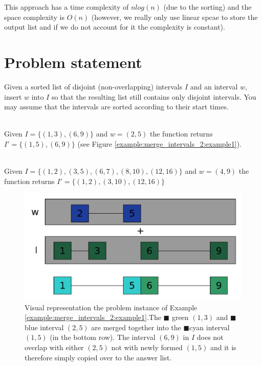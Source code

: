 This approach has a time complexity of $nlog(n)$ (due to the sorting) 
and the space complexity is $O(n)$ (however, we really only use linear spcae to store the output list and if we do not account for it the complexity is constant).

\section{Problem statement}
\begin{exercise}
\label{example:merge_intervals_2:exercice1_2}
Given a sorted list of disjoint (non-overlapping) intervals $I$ and an interval $w$, insert $w$ into $I$ so that the resulting list still contains only disjoint intervals.
You may assume that the intervals are sorted according to their start times.

	\begin{example}
		\label{example:merge_intervals_2:example1}
		\hfill \\
		Given $I=\{(1,3),(6,9)\}$ and $w=(2,5)$ the function returns $I'=\{(1,5),(6,9)\}$ (see Figure \ref{example:merge_intervals_2:example1}).
	\end{example}

	\begin{example}
		\label{example:merge_intervals_2:example2}
		\hfill \\
		Given $I=\{(1,2),(3,5),(6,7),(8,10),(12,16)\}$ and $w=(4,9)$ the function returns $I'=\{(1,2),(3,10),(12,16)\}$
	\end{example}

\end{exercise}

\begin{figure}
	\centering
	\includegraphics[width=\textwidth]{sources/merge_intervals_2/images/example1}
	\caption[Implicit graph for the Example \ref{example:merge_intervals_2:example1}.]
	{Visual representation the problem instance of Example
	\ref{example:merge_intervals_2:example1}.The \textcolor[HTML]{339966}{$\blacksquare$} green $(1,3)$ and \textcolor[HTML]{3366ff}{$\blacksquare$} blue interval $(2,5)$  are merged together into the \textcolor[HTML]{33cccc}{$\blacksquare$}cyan interval $(1,5)$ (in the bottom row). The interval $(6,9)$ in $I$ does not overlap with either $(2,5)$ not with newly formed $(1,5)$ and it is therefore simply copied over to the answer list.}
	\label{fig:merge_intervals_2:example1}
\end{figure}


